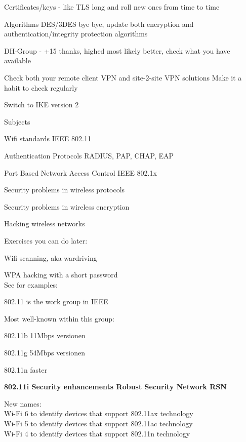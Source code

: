\documentclass[Screen16to9,17pt]{foils}
\begin{document}
\begin{list2}
\item Certificates/keys - like TLS long and roll new ones from time to time
\item Algorithms DES/3DES bye bye, update both encryption and authentication/integrity protection algorithms
\item DH-Group - +15 thanks, highed most likely better, check what you have available
\item Check both your remote client VPN and site-2-site VPN solutions Make it a habit to check regularly
\item Switch to IKE version 2
\end{list2}


\begin{list1}
\item Subjects
\begin{list2}

\item Wifi standards IEEE 802.11
\item Authentication Protocols RADIUS, PAP, CHAP, EAP
\item Port Based Network Access Control IEEE 802.1x
\item Security problems in wireless protocols
\item Security problems in wireless encryption
\item Hacking wireless networks
\end{list2}
\item Exercises you can do later:
\begin{list2}
\item Wifi scanning, aka wardriving
\item WPA hacking with a short password\\
See for examples: 
\end{list2}
\end{list1}




\begin{list1}
\item 802.11 is the work group in IEEE
\item Most well-known within this group:
\begin{list2}
\item 802.11b 11Mbps versionen
\item 802.11g 54Mbps versionen
\item 802.11n faster
\item {\bf 802.11i Security enhancements Robust Security Network RSN}
\end{list2}
\item New names:\\
Wi-Fi 6 to identify devices that support 802.11ax technology\\
Wi-Fi 5 to identify devices that support 802.11ac technology\\
Wi-Fi 4 to identify devices that support 802.11n technology
\end{list1}
\end{document}
